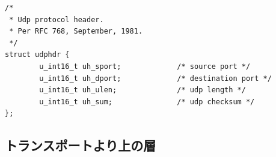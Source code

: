 \begin{lstlisting}[caption=UDPヘッダ定義 (/usr/include/netinet/udp.h),label=src:udp.h]
/*
 * Udp protocol header.
 * Per RFC 768, September, 1981.
 */
struct udphdr {
        u_int16_t uh_sport;             /* source port */
        u_int16_t uh_dport;             /* destination port */
        u_int16_t uh_ulen;              /* udp length */
        u_int16_t uh_sum;               /* udp checksum */
};
\end{lstlisting}

\subsection{トランスポートより上の層}